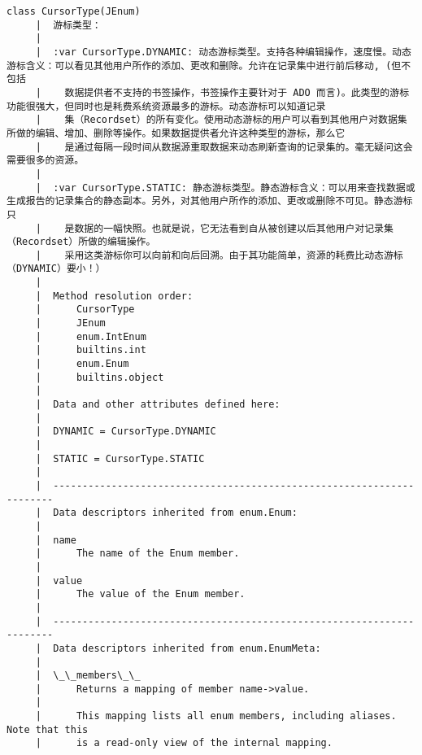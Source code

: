 \documentclass[11pt]{article}
\begin{document}
\begin{Verbatim}[commandchars=\\\{\}]
    class CursorType(JEnum)
     |  游标类型：
     |  
     |  :var CursorType.DYNAMIC: 动态游标类型。支持各种编辑操作，速度慢。动态游标含义：可以看见其他用户所作的添加、更改和删除。允许在记录集中进行前后移动, (但不包括
     |    数据提供者不支持的书签操作，书签操作主要针对于 ADO 而言)。此类型的游标功能很强大，但同时也是耗费系统资源最多的游标。动态游标可以知道记录
     |    集（Recordset）的所有变化。使用动态游标的用户可以看到其他用户对数据集所做的编辑、增加、删除等操作。如果数据提供者允许这种类型的游标，那么它
     |    是通过每隔一段时间从数据源重取数据来动态刷新查询的记录集的。毫无疑问这会需要很多的资源。
     |  
     |  :var CursorType.STATIC: 静态游标类型。静态游标含义：可以用来查找数据或生成报告的记录集合的静态副本。另外，对其他用户所作的添加、更改或删除不可见。静态游标只
     |    是数据的一幅快照。也就是说，它无法看到自从被创建以后其他用户对记录集（Recordset）所做的编辑操作。
     |    采用这类游标你可以向前和向后回溯。由于其功能简单，资源的耗费比动态游标（DYNAMIC）要小！）
     |  
     |  Method resolution order:
     |      CursorType
     |      JEnum
     |      enum.IntEnum
     |      builtins.int
     |      enum.Enum
     |      builtins.object
     |  
     |  Data and other attributes defined here:
     |  
     |  DYNAMIC = CursorType.DYNAMIC
     |  
     |  STATIC = CursorType.STATIC
     |  
     |  ----------------------------------------------------------------------
     |  Data descriptors inherited from enum.Enum:
     |  
     |  name
     |      The name of the Enum member.
     |  
     |  value
     |      The value of the Enum member.
     |  
     |  ----------------------------------------------------------------------
     |  Data descriptors inherited from enum.EnumMeta:
     |  
     |  \_\_members\_\_
     |      Returns a mapping of member name->value.
     |      
     |      This mapping lists all enum members, including aliases. Note that this
     |      is a read-only view of the internal mapping.
    

\end{Verbatim}
\end{document}
